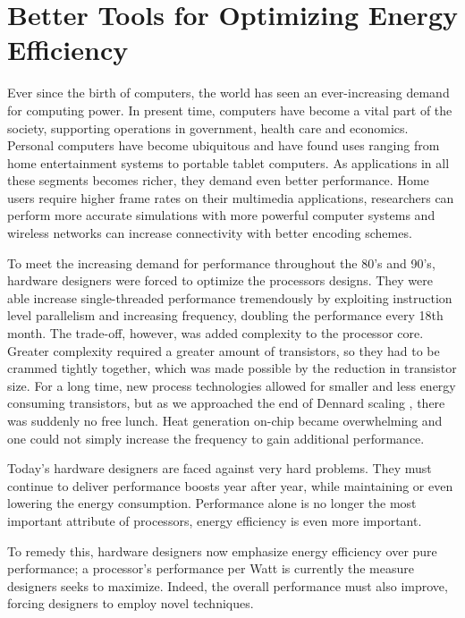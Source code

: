 \section{Better Tools for Optimizing Energy Efficiency}

Ever since the birth of computers, the world has seen an ever-increasing demand
for computing power. In present time, computers have become a vital part of the
society, supporting operations in government, health care and economics.
Personal computers have become ubiquitous and have found uses ranging from home
entertainment systems to portable tablet computers. As applications in all these
segments becomes richer, they demand even better performance. Home users require
higher frame rates on their multimedia applications, researchers can perform
more accurate simulations with more powerful computer systems and wireless
networks can increase connectivity with better encoding schemes.

To meet the increasing demand for performance throughout the 80's and 90's,
hardware designers were forced to optimize the processors designs. They were
able increase single-threaded performance tremendously by exploiting instruction
level parallelism and increasing frequency, doubling the performance every 18th
month. The trade-off, however, was added complexity to the processor core.
Greater complexity required a greater amount of transistors, so they had to be
crammed tightly together, which was made possible by the reduction in transistor
size. For a long time, new process technologies allowed for smaller and less
energy consuming transistors, but as we approached the end of Dennard scaling
\cite{dennard}, there was suddenly no free lunch. Heat generation on-chip
became overwhelming and one could not simply increase the frequency to gain
additional performance.

Today's hardware designers are faced against very hard problems. They must
continue to deliver performance boosts year after year, while maintaining
or even lowering the energy consumption. Performance alone is no longer the most
important attribute of processors, energy efficiency is even more important.


To remedy this, hardware designers now emphasize energy efficiency over pure
performance; a processor's performance per Watt is currently the measure
designers seeks to maximize. Indeed, the overall performance must also improve,
forcing designers to employ novel techniques.

